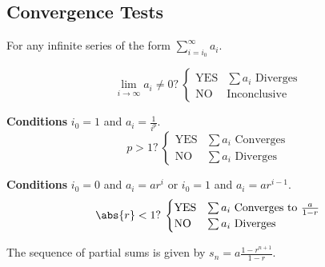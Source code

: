 \documentclass{article}
\begin{document}
\subsection{Convergence Tests}
For any infinite series of the form $\displaystyle\sum_{i=i_0}^\infty a_i$.
\begin{multicols}{2}
    \begin{tcolorboxcols}[title={Divergence Test}]
        \begin{equation*}
            \text{$\lim_{i\to\infty}a_i\neq0$?}\:
            \begin{cases}
                \text{YES} & \text{$\sum a_i$ Diverges} \\
                \text{NO}  & \text{Inconclusive}
            \end{cases}
        \end{equation*}
    \end{tcolorboxcols}
    \begin{tcolorboxcols}[title={$p$-Series}]
        \textbf{Conditions} $i_0=1$ and $a_i = \frac{1}{i^p}$.
        \begin{equation*}
            \text{$p>1$?}\:
            \begin{cases}
                \text{YES} & \text{$\sum a_i$ Converges} \\
                \text{NO}  & \text{$\sum a_i$ Diverges}
            \end{cases}
        \end{equation*}
    \end{tcolorboxcols}
    \begin{tcolorboxcols}[title={Geometric Series}]
        \textbf{Conditions} $i_0=0$ and $a_i = a r^i$ or $i_0=1$ and $a_i = a r^{i-1}$.
        \begin{equation*}
            \text{$\abs{r}<1$?}\:
            \begin{cases}
                \text{YES} & \text{$\sum a_i$ Converges to $\frac{a}{1-r}$} \\
                \text{NO}  & \text{$\sum a_i$ Diverges}
            \end{cases}
        \end{equation*}
    \end{tcolorboxcols}
    \begin{note}
        The sequence of partial sums is given by $\displaystyle s_n=a\frac{1-r^{n+1}}{1-r}$.
    \end{note}
    \begin{tcolorboxcols}[title={Alternating Series}]

\end{tcolorboxcols}
\end{multicols}
\end{document}
